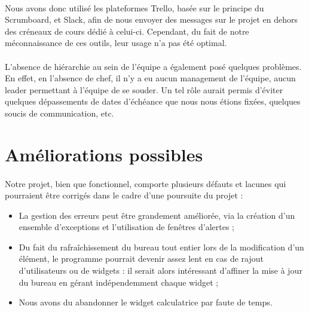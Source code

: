 \paragraph{}
Nous avons donc utilisé les plateformes Trello, basée sur le principe du Scrumboard, et Slack, afin de nous envoyer des messages sur le projet en dehors des créneaux de cours dédié à celui-ci. Cependant, du fait de notre méconnaissance de ces outils, leur usage n'a pas été optimal.

\paragraph{}
L'absence de hiérarchie au sein de l'équipe a également posé quelques problèmes. En effet, en l'absence de chef, il n'y a eu aucun management de l'équipe, aucun leader permettant à l'équipe de se souder. Un tel rôle aurait permis d'éviter quelques dépassements de dates d'échéance que nous nous étions fixées, quelques soucis de communication, etc. 

\section{Améliorations possibles}

\paragraph{}
Notre projet, bien que fonctionnel, comporte plusieurs défauts et lacunes qui pourraient être corrigés dans le cadre d'une poursuite du projet :
\begin{itemize}
	\item La gestion des erreurs peut être grandement améliorée, via la création d'un ensemble d'exceptions et l'utilisation de fenêtres d'alertes ;
	\item Du fait du rafraîchissement du bureau tout entier lors de la modification d'un élément, le programme pourrait devenir assez lent en cas de rajout d'utilisateurs ou de widgets : il serait alors intéressant d'affiner la mise à jour du bureau en gérant indépendemment chaque widget ;
	\item Nous avons du abandonner le widget calculatrice par faute de temps.
\end{itemize}


